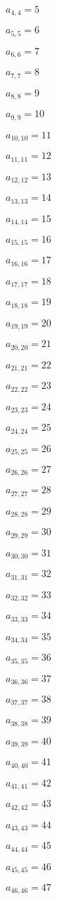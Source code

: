 \documentclass[a4paper,12pt]{article}
\begin{document}
$a _{ 4, 4 } = 5$

$a _{ 5, 5 } = 6$

$a _{ 6, 6 } = 7$

$a _{ 7, 7 } = 8$

$a _{ 8, 8 } = 9$

$a _{ 9, 9 } = 10$

$a _{ 10, 10 } = 11$

$a _{ 11, 11 } = 12$

$a _{ 12, 12 } = 13$

$a _{ 13, 13 } = 14$

$a _{ 14, 14 } = 15$

$a _{ 15, 15 } = 16$

$a _{ 16, 16 } = 17$

$a _{ 17, 17 } = 18$

$a _{ 18, 18 } = 19$

$a _{ 19, 19 } = 20$

$a _{ 20, 20 } = 21$

$a _{ 21, 21 } = 22$

$a _{ 22, 22 } = 23$

$a _{ 23, 23 } = 24$

$a _{ 24, 24 } = 25$

$a _{ 25, 25 } = 26$

$a _{ 26, 26 } = 27$

$a _{ 27, 27 } = 28$

$a _{ 28, 28 } = 29$

$a _{ 29, 29 } = 30$

$a _{ 30, 30 } = 31$

$a _{ 31, 31 } = 32$

$a _{ 32, 32 } = 33$

$a _{ 33, 33 } = 34$

$a _{ 34, 34 } = 35$

$a _{ 35, 35 } = 36$

$a _{ 36, 36 } = 37$

$a _{ 37, 37 } = 38$

$a _{ 38, 38 } = 39$

$a _{ 39, 39 } = 40$

$a _{ 40, 40 } = 41$

$a _{ 41, 41 } = 42$

$a _{ 42, 42 } = 43$

$a _{ 43, 43 } = 44$

$a _{ 44, 44 } = 45$

$a _{ 45, 45 } = 46$

$a _{ 46, 46 } = 47$
\end{document}
